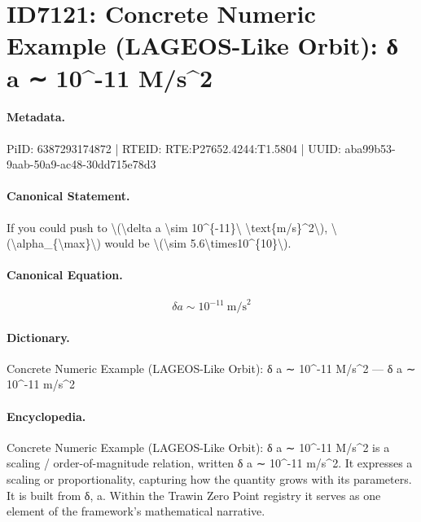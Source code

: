 \section*{ID7121: Concrete Numeric Example (LAGEOS-Like Orbit): δ a ∼ 10\textasciicircum{}-11 M/s\textasciicircum{}2}
\paragraph{Metadata.}
PiID: 6387293174872 | RTEID: RTE:P27652.4244:T1.5804 | UUID: aba99b53-9aab-50a9-ac48-30dd715e78d3

\paragraph{Canonical Statement.}
If you could push to \textbackslash{}(\textbackslash{}delta a \textbackslash{}sim 10\textasciicircum{}\{-11\}\textbackslash{} \textbackslash{}text\{m/s\}\textasciicircum{}2\textbackslash{}), \textbackslash{}(\textbackslash{}alpha\_\{\textbackslash{}max\}\textbackslash{}) would be \textbackslash{}(\textbackslash{}sim 5.6\textbackslash{}times10\textasciicircum{}\{10\}\textbackslash{}).

\paragraph{Canonical Equation.}
\[
\delta a \sim 10^{-11}\ \text{m/s}^2
\]

\paragraph{Dictionary.}
Concrete Numeric Example (LAGEOS-Like Orbit): δ a ∼ 10\textasciicircum{}-11 M/s\textasciicircum{}2 — δ a ∼ 10\textasciicircum{}-11 m/s\textasciicircum{}2

\paragraph{Encyclopedia.}
Concrete Numeric Example (LAGEOS-Like Orbit): δ a ∼ 10\textasciicircum{}-11 M/s\textasciicircum{}2 is a scaling / order-of-magnitude relation, written δ a ∼ 10\textasciicircum{}-11 m/s\textasciicircum{}2. It expresses a scaling or proportionality, capturing how the quantity grows with its parameters. It is built from δ, a. Within the Trawin Zero Point registry it serves as one element of the framework's mathematical narrative.
